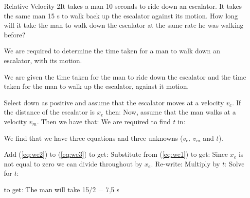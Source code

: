 \begin{wex}{Relative Velocity 2}{It takes a man 10 seconds to ride down an escalator. It takes the same man 15 s to walk back up the escalator against its motion. How long will it take the man to walk down the escalator at the same rate he was walking before?}
{
We are required to determine the time taken for a man to walk down an escalator, with its motion.

We are given the time taken for the man to ride down the escalator and the time taken for the man to walk up the escalator, against it motion.

Select down as positive and assume that the escalator moves at a velocity $v_e$. If the distance of the escalator is $x_e$ then:
Now, assume that the man walks at a velocity $v_m$. Then we have that:
We are required to find $t$ in:

We find that we have three equations and three unknowns ($v_e$, $v_m$ and $t$).

Add (\ref{eq:we2}) to (\ref{eq:we3}) to get:
Substitute from (\ref{eq:we1}) to get:
Since $x_e$ is not equal to zero we can divide throughout by $x_e$.
Re-write:
Multiply by $t$:
Solve for $t$:

to get:
The man will take 15/2 = 7,5 s
}
\end{wex}


